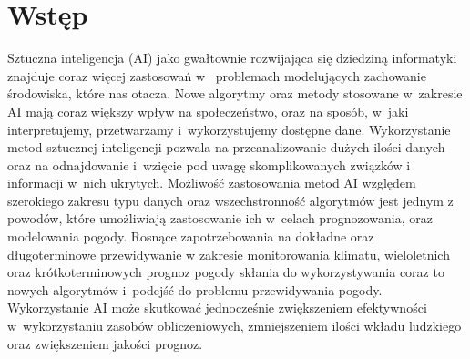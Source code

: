 



\section*{Wstęp}\label{sec:intro}

Sztuczna inteligencja (AI) jako gwałtownie rozwijająca się 
dziedziną informatyki znajduje coraz więcej zastosowań w~
problemach modelujących zachowanie środowiska, które nas otacza. 
Nowe algorytmy oraz metody stosowane w~zakresie AI mają coraz
większy wpływ na społeczeństwo, oraz na sposób, w~jaki interpretujemy,
przetwarzamy i~wykorzystujemy dostępne dane. Wykorzystanie metod
sztucznej inteligencji pozwala na przeanalizowanie dużych ilości
danych oraz na odnajdowanie i~wzięcie pod uwagę skomplikowanych związków
i informacji w~nich ukrytych. Możliwość zastosowania metod AI względem 
szerokiego zakresu typu danych oraz wszechstronność algorytmów jest jednym z~
powodów, które umożliwiają zastosowanie ich w~celach prognozowania, oraz modelowania
pogody. Rosnące zapotrzebowania na dokładne oraz długoterminowe przewidywanie
w zakresie monitorowania klimatu, wieloletnich oraz krótkoterminowych prognoz
pogody skłania do wykorzystywania coraz to nowych algorytmów i~podejść
do problemu przewidywania pogody. Wykorzystanie AI może skutkować jednocześnie 
zwiększeniem efektywności w~wykorzystaniu zasobów obliczeniowych, zmniejszeniem
ilości wkładu ludzkiego oraz zwiększeniem jakości prognoz.

